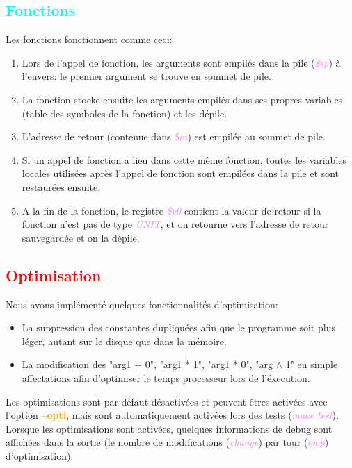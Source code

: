 \documentclass[a4paper]{article}
\let\oldtextbf\textbf
\renewcommand{\textbf}[1]{\textcolor{orange}{\oldtextbf{#1}}}
\let\oldtextit\textit
\renewcommand{\textit}[1]{\textcolor{violet}{\oldtextit{#1}}}
\newcommand{\csection}[1]{\textcolor{red}{\section{#1}}}
\newcommand{\csubsection}[1]{\textcolor{cyan}{\subsection{#1}}}
\begin{document}
\csubsection{Fonctions}

Les fonctions fonctionnent comme ceci:
\begin{enumerate}
    \item Lors de l'appel de fonction, les arguments sont empilés dans la pile (\textit{\$sp}) à l'envers: le premier argument se trouve en sommet de pile.
    \item La fonction stocke ensuite les arguments empilés dans ses propres variables (table des symboles de la fonction) et les dépile.
    \item L'adresse de retour (contenue dans \textit{\$ra}) est empilée au sommet de pile.
    \item Si un appel de fonction a lieu dans cette même fonction, toutes les variables locales utilisées après l'appel de fonction sont empilées dans la pile et sont restaurées ensuite.
    \item A la fin de la fonction, le registre \textit{\$v0} contient la valeur de retour si la fonction n'est pas de type \textit{UNIT}, et on retourne vers l'adresse de retour sauvegardée et on la dépile.
\end{enumerate}

\clearpage

\csection{Optimisation}

Nous avons implémenté quelques fonctionnalités d'optimisation:
\begin{itemize}
    \item La suppression des constantes dupliquées afin que le programme soit plus léger, autant sur le disque que dans la mémoire.
    \item La modification des "arg1 + 0", "arg1 * 1", "arg1 * 0", "arg $\wedge$ 1" en simple affectations afin d'optimiser le temps processeur lors de l'éxecution.
\end{itemize}

Les optimisations sont par défaut désactivées et peuvent êtres activées avec l'option \textbf{--opti}, mais sont automatiquement activées lors des tests (\textit{make test}).
Lorsque les optimisations sont activées, quelques informations de debug sont affichées dans la sortie (le nombre de modifications (\textit{change}) par tour (\textit{loop}) d'optimisation).
\end{document}
